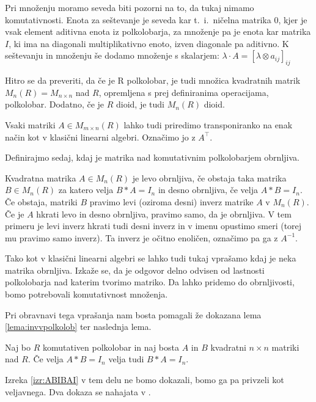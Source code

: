 \documentclass[mat1]{fmfdelo}
\begin{document}
Pri množenju moramo seveda biti pozorni na to, da tukaj nimamo komutativnosti. Enota za seštevanje je seveda kar t.~i.~ničelna matrika $0$, kjer je vsak element aditivna enota iz polkolobarja, za množenje pa je enota kar matrika $I$, ki ima na diagonali multiplikativno enoto, izven diagonale pa aditivno. K seštevanju in množenju še dodamo množenje s skalarjem: $\lambda \cdot A = [\lambda \otimes a_{ij}]_{ij}$

Hitro se da preveriti, da če je R polkolobar, je tudi množica kvadratnih matrik $M_n(R) = M_{n\times n}$ nad $R$, opremljena s prej definiranima operacijama, polkolobar. Dodatno, če je $R$ dioid, je tudi $M_n(R)$ dioid.

Vsaki matriki $A\in M_{m\times n}(R)$ lahko tudi priredimo transponiranko na enak način kot v klasični linearni algebri. Označimo jo z $A^{\top}$.

Definirajmo sedaj, kdaj je matrika nad komutativnim polkolobarjem obrnljiva.

\begin{definicija}\label{def:invmatr}
	Kvadratna matrika $A\in M_n(R)$ je levo obrnljiva, če obstaja taka matrika $B\in M_n(R)$ za katero velja $B*A = I_n$ in desno obrnljiva, če velja $A*B = I_n$. Če obstaja, matriki $B$ pravimo levi (oziroma desni) inverz matrike $A$ v $M_n(R)$. Če je $A$ hkrati levo in desno obrnljiva, pravimo samo, da je obrnljiva. V tem primeru je levi inverz hkrati tudi desni inverz in v imenu opustimo smeri (torej mu pravimo samo inverz). Ta inverz je očitno enoličen, označimo pa ga z $A^{-1}$.
\end{definicija}

Tako kot v klasični linearni algebri se lahko tudi tukaj vprašamo kdaj je neka matrika obrnljiva. Izkaže se, da je odgovor delno odvisen od lastnosti polkolobarja nad katerim tvorimo matriko. Da lahko pridemo do obrnljivosti, bomo potrebovali komutativnost množenja.

Pri obravnavi tega vprašanja nam bosta pomagali že dokazana lema \ref{lema:invvpolkolob} ter naslednja lema.

\begin{izrek}\label{izr:ABIBAI}
	Naj bo $R$ komutativen polkolobar in naj bosta $A$ in $B$ kvadratni $n\times n$ matriki nad $R$. Če velja $A*B = I_n$ velja tudi $B*A=I_n$.
\end{izrek}

Izreka \ref{izr:ABIBAI} v tem delu ne bomo dokazali, bomo ga pa privzeli kot veljavnega. Dva dokaza se nahajata v \cite[poglavje 3 in poglavje 4]{bib:Reutenauer}.
\end{document}
